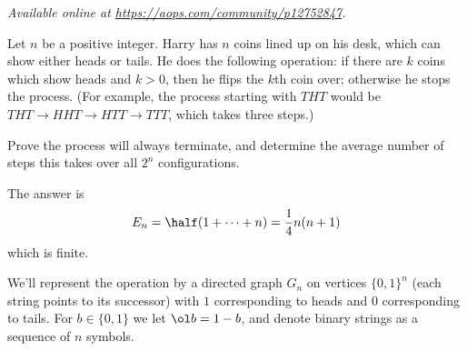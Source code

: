 \textsl{Available online at \url{https://aops.com/community/p12752847}.}
\begin{mdframed}[style=mdpurplebox,frametitle={Problem statement}]
Let $n$ be a positive integer.
Harry has $n$ coins lined up on his desk, which can show either heads or tails.
He does the following operation: if there are $k$ coins which show heads and $k > 0$,
then he flips the $k$th coin over; otherwise he stops the process.
(For example, the process starting with $THT$ would be
$THT \to HHT \to HTT \to TTT$, which takes three steps.)

Prove the process will always terminate, and determine the average number of steps
this takes over all $2^n$ configurations.
\end{mdframed}
The answer is \[ E_n = \half (1 + \dots + n) = \frac14 n(n+1) \]
which is finite.

We'll represent the operation by a
directed graph $G_n$ on vertices $\{0,1\}^n$
(each string points to its successor)
with $1$ corresponding to heads and $0$ corresponding to tails.
For $b \in \{0,1\}$ we let $\ol b = 1-b$,
and denote binary strings as a sequence of $n$ symbols.

